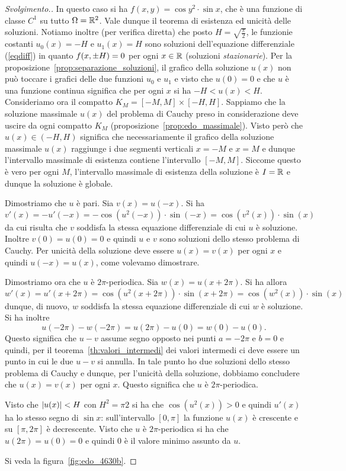 \begin{proof}[Svolgimento.]
In questo caso si ha $f(x,y)=\cos y^2\cdot \sin x$, che \`e una funzione
di classe $C^1$ su tutto $\Omega={\mathbb R}^2$.
Vale dunque il teorema di esistenza ed
unicità delle soluzioni.
Notiamo inoltre (per verifica diretta)
che posto $H=\sqrt{\frac \pi 2}$, le funzionie 
costanti $u_0(x)=-H$ e $u_1(x)=H$ sono
soluzioni dell'equazione differenziale (\ref{eqdiff})
in quanto $f{\left( x,\pm H \right)}=0$ per ogni $x\in {\mathbb R}$
(soluzioni \emph{stazionarie}).
Per la proposizione~\ref{prop:separazione_soluzioni},
il grafico della soluzione $u(x)$
non può toccare i grafici delle due funzioni $u_0$ e $u_1$ e visto
che $u(0)=0$ e che $u$ è una funzione continua significa
che per ogni $x$ si ha $-H < u(x) < H$.
Consideriamo ora il compatto
$K_M=[-M,M] \times [-H,H]$.
Sappiamo che la soluzione
massimale $u(x)$ del problema di Cauchy preso in considerazione deve
uscire da ogni compatto $K_M$
(proposizione~\ref{prop:edo_massimale}).
Visto però che $u(x)\in (-H,H)$ significa che necessariamente
il grafico della soluzione massimale $u(x)$
raggiunge i due segmenti verticali
$x=-M$ e $x=M$ e dunque l'intervallo massimale di esistenza
contiene l'intervallo $[-M,M]$.
Siccome questo è vero per ogni $M$, l'intervallo massimale
di esistenza della soluzione è $I={\mathbb R}$ e dunque la soluzione
è globale.

Dimostriamo che $u$ è pari. Sia $v(x)=u(-x)$. 
Si ha 
\[ 
    v'(x) = -u'(-x) 
    = -\cos(u^2(-x))\cdot \sin(-x) 
    = \cos(v^2(x))\cdot \sin(x)
\]
da cui risulta che $v$ soddisfa la stessa equazione differenziale 
di cui $u$ è soluzione. 
Inoltre $v(0)=u(0)=0$ e quindi $u$ e $v$ sono soluzioni dello 
stesso problema di Cauchy. Per unicità della soluzione 
deve essere $u(x)=v(x)$ per ogni $x$ e quindi $u(-x)=u(x)$, come 
volevamo dimostrare.
  
Dimostriamo ora che $u$ è $2\pi$-periodica.
Sia $w(x)=u(x+2\pi)$. Si ha allora 
\[
  w'(x) = u'(x+2\pi) = \cos(u^2(x+2\pi))\cdot \sin(x+2\pi) 
  = \cos(w^2(x))\cdot \sin(x) 
\]
dunque, di nuovo, $w$ soddisfa la stessa equazione differenziale
di cui $w$ è soluzione. Si ha inoltre 
\[
  u(-2\pi) - w(-2\pi) = u(2\pi) - u(0) = w(0) - u(0).
\]
Questo significa che $u-v$ assume segno opposto nei punti 
$a=-2\pi$ e $b=0$ e quindi, per il teorema~\ref{th:valori_intermedi}
dei valori intermedi ci deve essere un punto in cui le due 
$u-v$ si annulla. In tale punto ho due soluzioni dello stesso 
problema di Cauchy e dunque, per l'unicità della soluzione, 
dobbiamo concludere che $u(x)=v(x)$ per ogni $x$.
Questo significa che $u$ è $2\pi$-periodica.

Visto che ${\left|u(x)\right|}<H$ con $H^2=\pi 2$ si ha che $\cos(u^2(x))>0$ 
e quindi $u'(x)$ ha lo stesso segno di $\sin x$: sull'intervallo 
$[0,\pi]$ la funzione $u(x)$ è crescente e su $[\pi,2\pi]$ è decrescente.
Visto che $u$ è $2\pi$-periodica si ha che $u(2\pi)=u(0)=0$ e quindi 
$0$ è il valore minimo assunto da $u$.

Si veda la figura~\ref{fig:edo_4630b}.
\end{proof}

